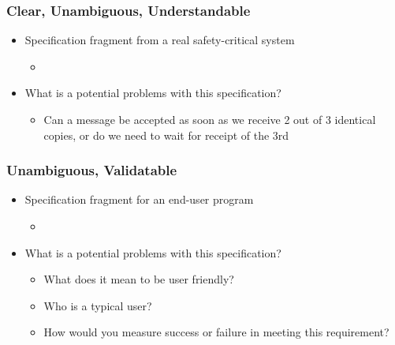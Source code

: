 \documentclass[t,12pt,numbers,fleqn]{beamer}
\begin{document}

\begin{frame}
\frametitle{Clear, Unambiguous, Understandable}

\begin{itemize}

\item Specification fragment from a real safety-critical system
\begin{itemize}
\item {}
\end{itemize}
\item What is a potential problems with this specification?
\begin{itemize}
\item<2-> {\alert{Can a message be accepted as soon as we receive 2 out of 3 identical copies, or do we need to wait
for receipt of the 3rd}}
\end{itemize}
\end{itemize}

\end{frame}


\begin{frame}
\frametitle{Unambiguous, Validatable}

\begin{itemize}

\item Specification fragment for an end-user program
\begin{itemize}
\item {}
\end{itemize}
\item What is a potential problems with this specification?
\begin{itemize}
\item<2-> {\alert{What does it mean to be user friendly?}}
\item<2-> {\alert{Who is a typical user?}}
\item<2-> {\alert{How would you measure success or failure in meeting this requirement?}}
\end{itemize}

\end{itemize}

\end{frame}
\end{document}
